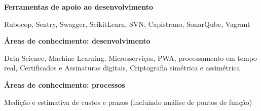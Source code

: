 \textbf{Ferramentas de apoio ao desenvolvimento}

Rubocop, Sentry, Swagger, ScikitLearn, SVN, Capistrano, SonarQube, Vagrant \newline{}

\textbf{Áreas de conhecimento: desenvolvimento}

Data Science, Machine Learning, Microsserviços, PWA, processamento em tempo real, Certificados e Assinaturas digitais, Criptografia simétrica e assimétrica \newline{}

\textbf{Áreas de conhecimento: processos}

Medição e estimativa de custos e prazos (incluindo análise de pontos de função) \newline{}

